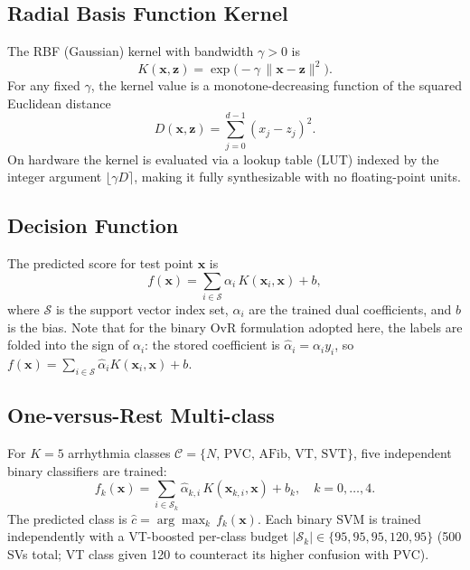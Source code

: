 \documentclass[11pt]{article}
\begin{document}
\subsection{Radial Basis Function Kernel}

The RBF (Gaussian) kernel with bandwidth $\gamma > 0$ is
\begin{equation}
  K(\mathbf{x},\mathbf{z}) = \exp\!\bigl(-\gamma\,\|\mathbf{x}-\mathbf{z}\|^2\bigr).
  \label{eq:rbf}
\end{equation}
For any fixed $\gamma$, the kernel value is a monotone-decreasing function of the
squared Euclidean distance
\begin{equation}
  D(\mathbf{x},\mathbf{z}) = \sum_{j=0}^{d-1}(x_j - z_j)^2.
  \label{eq:dist}
\end{equation}
On hardware the kernel is evaluated via a lookup table
(LUT) indexed by the integer argument $\lfloor \gamma D \rceil$, making it
fully synthesizable with no floating-point units.

\subsection{Decision Function}

The predicted score for test point $\mathbf{x}$ is
\begin{equation}
  f(\mathbf{x}) = \sum_{i \in \mathcal{S}} \alpha_i\, K(\mathbf{x}_i,\mathbf{x}) + b,
  \label{eq:decision}
\end{equation}
where $\mathcal{S}$ is the support vector index set, $\alpha_i$ are the trained
dual coefficients, and $b$ is the bias.  Note that for the binary OvR formulation
adopted here, the labels are folded into the sign of $\alpha_i$: the stored
coefficient is $\hat\alpha_i = \alpha_i y_i$, so $f(\mathbf{x}) =
\sum_{i\in\mathcal{S}}\hat\alpha_i K(\mathbf{x}_i,\mathbf{x}) + b$.

\subsection{One-versus-Rest Multi-class}

For $K=5$ arrhythmia classes $\mathcal{C} = \{N,\,\text{PVC},\,\text{AFib},\,\text{VT},\,\text{SVT}\}$,
five independent binary classifiers are trained:
\begin{equation}
  f_k(\mathbf{x}) = \sum_{i \in \mathcal{S}_k} \hat\alpha_{k,i}\,K(\mathbf{x}_{k,i},\mathbf{x}) + b_k,
  \quad k = 0,\dots,4.
  \label{eq:ovr}
\end{equation}
The predicted class is $\hat{c} = \arg\max_{k}\,f_k(\mathbf{x})$.  Each binary
SVM is trained independently with a VT-boosted per-class budget
$|\mathcal{S}_k| \in \{95,95,95,120,95\}$ (500 SVs total; VT class given 120
to counteract its higher confusion with PVC).
\end{document}
